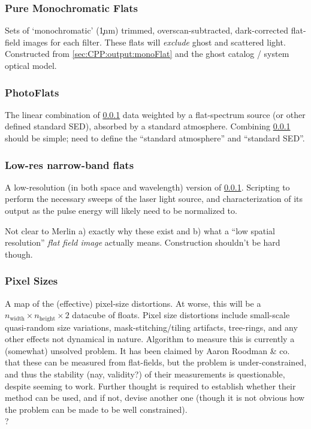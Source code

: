 \subsubsection{Pure Monochromatic Flats}\label{sec:CPP:output:monoPhotoFlat}
Sets of `monochromatic' (\c 1nm) trimmed, overscan-subtracted, dark-corrected flat-field images for each filter. These flats will \emph{exclude} ghost and scattered light.
\alg Constructed from \secsymbol\ref{sec:CPP:output:monoFlat} and the ghost catalog / system optical model.


\subsubsection{PhotoFlats}\label{sec:CPP:output:standardPhotoFlat}
The linear combination of \secsymbol\ref{sec:CPP:output:monoPhotoFlat} data weighted by a flat-spectrum source (or other defined standard SED), absorbed by a standard atmosphere.
\alg Combining \secsymbol\ref{sec:CPP:output:monoPhotoFlat} should be simple; need to define the ``standard atmosphere'' and ``standard SED''.


\subsubsection{Low-res narrow-band flats}\label{sec:CPP:output:monoPhotoFlatLowRes}
A low-resolution (in both space and wavelength) version of \secsymbol\ref{sec:CPP:output:monoPhotoFlat}.
\alg Scripting to perform the necessary sweeps of the laser light source, and characterization of its output as the pulse energy will likely need to be normalized to.
\begin{note}
	{Not clear to Merlin a) exactly why these exist and b) what a ``low spatial resolution'' \emph{flat field image} actually means. Construction shouldn't be hard though.}
\end{note}


\subsubsection{Pixel Sizes}\label{sec:CPP:output:pixelSizeMap} 
A map of the (effective) pixel-size distortions. At worse, this will be a $n_{\mbox{width}}\times n_{\mbox{height}}\times 2$ datacube of floats. Pixel size distortions include small-scale quasi-random size variations, mask-stitching/tiling artifacts, tree-rings, and any other effects not dynamical in nature.
\alg Algorithm to measure this is currently a (somewhat) unsolved problem. It has been claimed by Aaron Roodman \& co. that these can be measured from flat-fields, but the problem is under-constrained, and thus the stability (nay, validity?) of their measurements is questionable, despite seeming to work. Further thought is required to establish whether their method can be used, and if not, devise another one (though it is not obvious how the problem can be made to be well constrained). 
\\ \dragons ?


